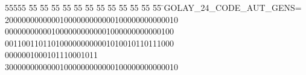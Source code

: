 %
%
\begin{tabbing}
55555 \= 55 \= 55 \= 55 \= 55 \= 55 \= 55 \= 55 \= 55 \= 55 \= 55 \= 55 \= 55 \= \>GOLAY\_24\_CODE\_AUT\_GENS=\\[0pt]
20000000000001000000000000100000000000010\\[0pt]
\>0000000000010000000000001000000000000100\\[0pt]
0011001101101000000000001010010110111000\\[0pt]
\>0000001000101110001011\\[0pt]
30000000000001000000000000100000000000010\\[0pt]

\end{tabbing}
